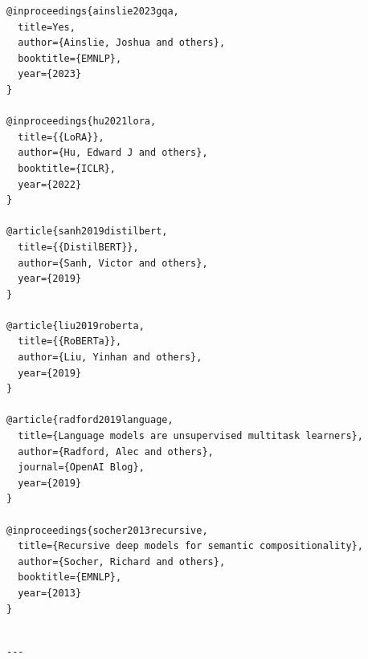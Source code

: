 \begin{lstlisting}
@inproceedings{ainslie2023gqa,
  title=Yes,
  author={Ainslie, Joshua and others},
  booktitle={EMNLP},
  year={2023}
}

@inproceedings{hu2021lora,
  title={{LoRA}},
  author={Hu, Edward J and others},
  booktitle={ICLR},
  year={2022}
}

@article{sanh2019distilbert,
  title={{DistilBERT}},
  author={Sanh, Victor and others},
  year={2019}
}

@article{liu2019roberta,
  title={{RoBERTa}},
  author={Liu, Yinhan and others},
  year={2019}
}

@article{radford2019language,
  title={Language models are unsupervised multitask learners},
  author={Radford, Alec and others},
  journal={OpenAI Blog},
  year={2019}
}

@inproceedings{socher2013recursive,
  title={Recursive deep models for semantic compositionality},
  author={Socher, Richard and others},
  booktitle={EMNLP},
  year={2013}
}
\end{lstlisting}
\begin{lstlisting}

---
\end{lstlisting}